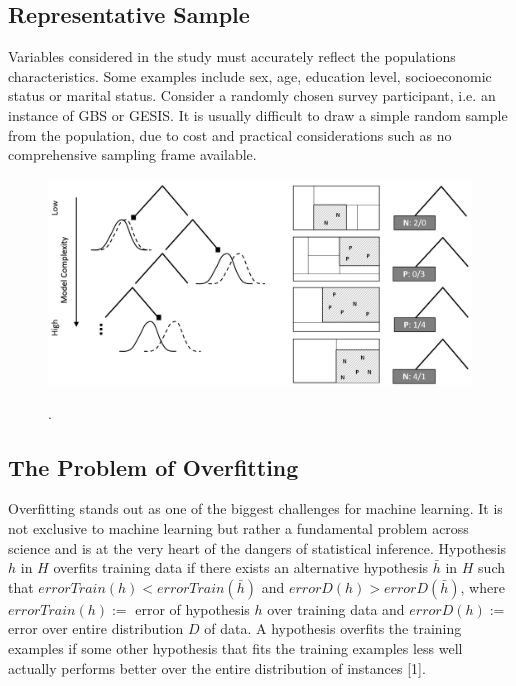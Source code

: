 \subsection{Representative Sample}

Variables considered in the study must accurately reflect the populations characteristics. Some examples include sex, age, education level, socioeconomic status or marital status. Consider a randomly chosen survey participant, i.e. an instance of GBS or GESIS. It is usually difficult to draw a simple random sample from the population, due to cost and practical considerations such as no comprehensive sampling frame available.

\begin{figure}[ht]
	\begin{center}
		\includegraphics[scale=0.40,angle=0]{fig/tree3}
		\label{project}
		\caption{.}
	\end{center}
\end{figure}

\subsection{The Problem of Overfitting}

Overﬁtting stands out as one of the biggest challenges for machine learning. It is not exclusive to machine learning but rather a fundamental problem across science and is at the very heart of the dangers of statistical inference. Hypothesis \(h\) in \(H\) overﬁts training data if there exists an alternative hypothesis \(\bar{h}\) in \(H\) such that \(errorTrain(h) < errorTrain(\bar{h})\) and \(errorD(h) > errorD(\bar{h})\), where \(errorTrain(h):=\) error of hypothesis \(h\) over training data and \(errorD(h):=\) error over entire distribution \(D\) of data. A hypothesis overfits the training examples if some other hypothesis that fits the training examples less well actually performs better over the entire distribution of instances [1].

